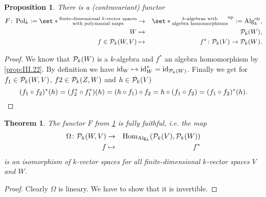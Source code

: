 \documentclass[12pt,a4paper]{scrartcl}
\theoremstyle{cplain}
\theoremstyle{cplain}
\newtheorem{thm}[thmcounter]{Theorem}
\theoremstyle{cplain}
\newtheorem{prop}[thmcounter]{Proposition}
\theoremstyle{definition}
\begin{document}
\begin{otherlanguage}{english}

\begin{prop} \label{prop:III.23}
  There is a (contravariant) functor
  \begin{eqnarray*}
    F\colon \Pol_k := \set*{\substack{\text{finite-dimensional $k$-vector spaces}\\\text{with polynomial maps}}} &\to& \set*{\substack{\text{$k$-algebras with}\\\text{algebra homomorphisms}}}^{\op} := \Alg_k^{\op}, \\
    W &\mapsto& \Ps_k(W), \\
    f\in \Ps_k(W,V) &\mapsto& f^*\colon \Ps_k(V) \to \Ps_k(W).
  \end{eqnarray*}
\end{prop}
\begin{proof}
  We know that $\mathcal{P}_k(W)$ is a $k$-algebra and $f^*$ an algebra homomorphism by \cref{prop:III.22}. By definition we have $\operatorname{id}_W \mapsto \operatorname{id}_W^* = \operatorname{id}_{\mathcal{P}_k(W)}$. Finally we get for $f_1 \in \mathcal{P}_k(W,V)$, $f2 \in \mathcal{P}_k(Z,W)$ and $h\in \mathcal{P}_k(V)$ \[ (f_1 \circ f_2)^*(h) = (f_2^* \circ f_1^*)(h) = (h \circ f_1) \circ f_2 = h \circ (f_1 \circ f_2) = (f_1 \circ f_2)^*(h). \qedhere \]
\end{proof}

\begin{thm}
  The functor $F$ from \cref{prop:III.23} is fully faithful, i.e. the map
  \begin{eqnarray*}
    \Omega\colon \mathcal{P}_k(W,V) &\to& \operatorname{Hom}_{\operatorname{Alg}_k}(\mathcal{P}_k(V),\mathcal{P}_k(W))\\
    f &\mapsto& f^*
  \end{eqnarray*}
  is an isomorphism of $k$-vector spaces for all finite-dimensional $k$-vector spaces $V$ and $W$.
\end{thm}
\begin{proof}
  Clearly $\Omega$ is lineary. We have to show that it is invertible.
  

\end{proof}
\end{otherlanguage}
\end{document}
